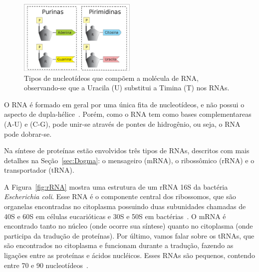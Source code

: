 \begin{figure}[ht]
\centering
\includegraphics[angle=0,width=0.5\textwidth]{imagens//2007eu-nucleotideoRNA1}
\caption{Tipos de nucleotídeos que compõem a molécula de RNA, observando-se que a Uracila (U) substitui a Timina (T) nos RNAs. \label{fig:nucleotideoRNA}}
\end{figure}


O RNA é formado em geral por uma única fita de nucleotídeos, e não possui o aspecto de dupla-hélice~\citep{koolman:2005}. Porém, como o RNA tem como bases complementareas (A-U) e (C-G), pode unir-se através de pontes de hidrogênio, ou seja, o RNA pode dobrar-se.

Na síntese de proteínas estão envolvidos três tipos de RNAs, descritos com mais detalhes na Seção~\ref{sec:Dogma}: o mensageiro (mRNA), o ribossômico (rRNA) e o transportador (tRNA).


A Figura~\ref{fig:rRNA} mostra uma estrutura de um rRNA 16S da bactéria \textsl{Escherichia coli}. Esse RNA é o componente central dos ribossomos, que são organelas encontradas no citoplasma possuindo duas subunidades chamadas de 40S e 60S em células eucarióticas e 30S e 50S em bactérias~\citep{lafontaine:2001}. O mRNA é encontrado tanto no núcleo (onde ocorre sua síntese) quanto no citoplasma (onde participa da tradução de proteínas). Por último, vamos falar sobre os tRNAs, que são encontrados no citoplasma e funcionam durante a tradução, fazendo as ligações entre as proteínas e ácidos nucléicos. Esses RNAs são pequenos, contendo entre 70 e 90 nucleotídeos~\citep{koolman:2005}.

